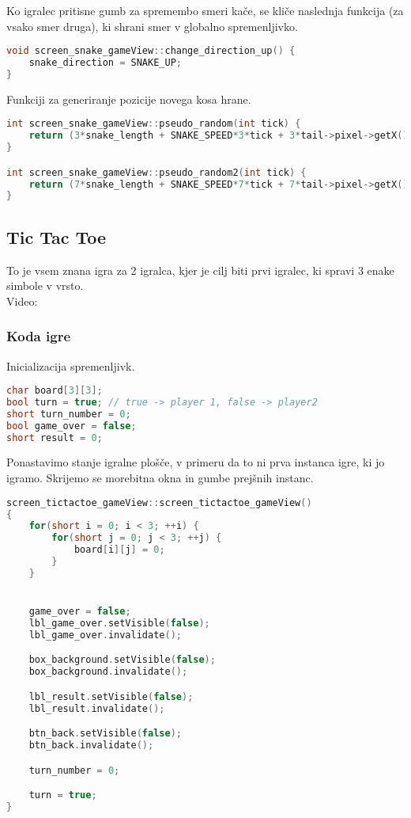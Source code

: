 \documentclass{article}
\begin{document}
\noindent
Ko igralec pritisne gumb za spremembo smeri ka\v{c}e, se kli\v{c}e
naslednja funkcija (za vsako smer druga), ki shrani smer v globalno
spremenljivko.
\begin{lstlisting}[language=c++]
void screen_snake_gameView::change_direction_up() {
	snake_direction = SNAKE_UP;
}
\end{lstlisting}

\noindent
Funkciji za generiranje pozicije novega kosa hrane.
\begin{lstlisting}[language=c++]
int screen_snake_gameView::pseudo_random(int tick) {
	return (3*snake_length + SNAKE_SPEED*3*tick + 3*tail->pixel->getX() * 3*tail->pixel->getY());
}

int screen_snake_gameView::pseudo_random2(int tick) {
	return (7*snake_length + SNAKE_SPEED*7*tick + 7*tail->pixel->getX() * 7*tail->pixel->getY());
}
\end{lstlisting}

\subsection{Tic Tac Toe}
\noindent
To je vsem znana igra za 2 igralca, kjer je cilj biti prvi igralec, ki
spravi 3 enake simbole v vrsto. \\
Video:

\subsubsection{Koda igre}
\noindent
Inicializacija spremenljivk.
\begin{lstlisting}[language=c++]
char board[3][3];
bool turn = true; // true -> player 1, false -> player2
short turn_number = 0;
bool game_over = false;
short result = 0;
\end{lstlisting}

\noindent
Ponastavimo stanje igralne plo\v{s}\v{c}e, v primeru da to ni prva
instanca igre, ki jo igramo. Skrijemo se morebitna okna in gumbe
prej\v{s}nih instanc.
\begin{lstlisting}[language=c++]
screen_tictactoe_gameView::screen_tictactoe_gameView()
{
    for(short i = 0; i < 3; ++i) {
        for(short j = 0; j < 3; ++j) {
            board[i][j] = 0;
        }
    }


    game_over = false;
    lbl_game_over.setVisible(false);
    lbl_game_over.invalidate();

    box_background.setVisible(false);
    box_background.invalidate();

    lbl_result.setVisible(false);
    lbl_result.invalidate();

    btn_back.setVisible(false);
    btn_back.invalidate();

    turn_number = 0;

    turn = true;
}
\end{lstlisting}
\end{document}
